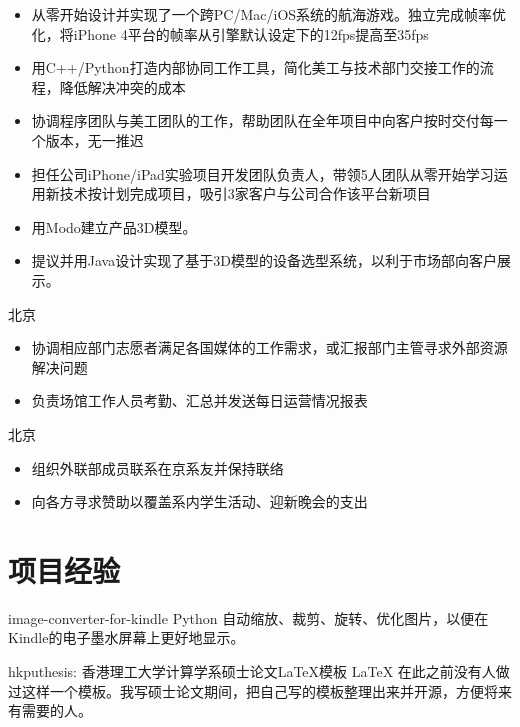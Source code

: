 \documentclass[10pt,a4paper]{moderncv/moderncv}
\begin{document}
{
\begin{itemize}
	\item 从零开始设计并实现了一个跨PC/Mac/iOS系统的航海游戏。独立完成帧率优化，将iPhone 4平台的帧率从引擎默认设定下的12fps提高至35fps
	\item 用C++/Python打造内部协同工作工具，简化美工与技术部门交接工作的流程，降低解决冲突的成本
	\item 协调程序团队与美工团队的工作，帮助团队在全年项目中向客户按时交付每一个版本，无一推迟
	\item 担任公司iPhone/iPad实验项目开发团队负责人，带领5人团队从零开始学习运用新技术按计划完成项目，吸引3家客户与公司合作该平台新项目
\end{itemize}
}

{
\begin{itemize}
	\item 用Modo建立产品3D模型。
	\item 提议并用Java设计实现了基于3D模型的设备选型系统，以利于市场部向客户展示。
\end{itemize}
}

{北京}{}
{
\begin{itemize}
	\item 协调相应部门志愿者满足各国媒体的工作需求，或汇报部门主管寻求外部资源解决问题
	\item 负责场馆工作人员考勤、汇总并发送每日运营情况报表
\end{itemize}
}

{北京}{}
{
\begin{itemize}
	\item 组织外联部成员联系在京系友并保持联络
	\item 向各方寻求赞助以覆盖系内学生活动、迎新晚会的支出
\end{itemize}
}

\section{项目经验}
{image-converter-for-kindle}
{Python}
{}{}
{
自动缩放、裁剪、旋转、优化图片，以便在Kindle的电子墨水屏幕上更好地显示。
}


{hkputhesis: 香港理工大学计算学系硕士论文\LaTeX 模板}
{LaTeX}
{}{}
{
在此之前没有人做过这样一个模板。我写硕士论文期间，把自己写的模板整理出来并开源，方便将来有需要的人。
}
\end{document}
